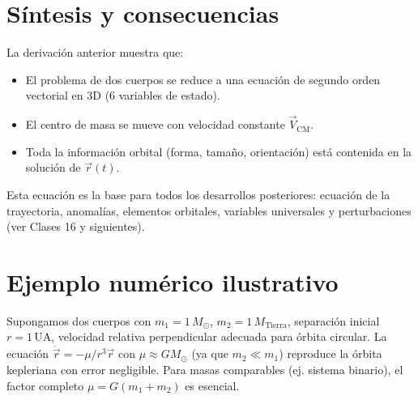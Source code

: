 \section{Síntesis y consecuencias}
La derivación anterior muestra que:
\begin{itemize}
    \item El problema de dos cuerpos se reduce a una ecuación de segundo orden vectorial en 3D (6 variables de estado).
    \item El centro de masa se mueve con velocidad constante \(\vec{V}_{\text{CM}}\).
    \item Toda la información orbital (forma, tamaño, orientación) está contenida en la solución de \(\vec{r}(t)\).
\end{itemize}

Esta ecuación es la base para todos los desarrollos posteriores: ecuación de la trayectoria, anomalías, elementos orbitales, variables universales y perturbaciones (ver Clases 16 y siguientes).

\section{Ejemplo numérico ilustrativo}
Supongamos dos cuerpos con \(m_1 = 1\,M_\odot\), \(m_2 = 1\,M_\text{Tierra}\), separación inicial \(r = 1\,\text{UA}\), velocidad relativa perpendicular adecuada para órbita circular. La ecuación \(\ddot{\vec{r}} = -\mu/r^3 \vec{r}\) con \(\mu \approx G M_\odot\) (ya que \(m_2 \ll m_1\)) reproduce la órbita kepleriana con error negligible. Para masas comparables (ej. sistema binario), el factor completo \(\mu = G(m_1+m_2)\) es esencial.